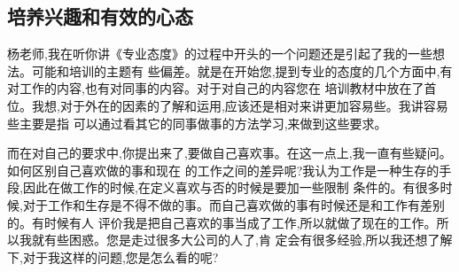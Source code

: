 \documentclass[11pt]{article}
\begin{document}
\subsection{培养兴趣和有效的心态}
\begin{staff}
  \slogo 杨老师,我在听你讲《专业态度》的过程中开头的一个问题还是引起了我的一些想法。可能和培训的主题有
  些偏差。就是在开始您,提到专业的态度的几个方面中,有对工作的内容,也有对同事的内容。对于对自己的内容您在
  培训教材中放在了首位。我想,对于外在的因素的了解和运用,应该还是相对来讲更加容易些。我讲容易些主要是指
  可以通过看其它的同事做事的方法学习,来做到这些要求。

  而在对自己的要求中,你提出来了,要做自己喜欢事。在这一点上,我一直有些疑问。如何区别自己喜欢做的事和现在
  的工作之间的差异呢?我认为工作是一种生存的手段,因此在做工作的时候,在定义喜欢与否的时候是要加一些限制
  条件的。有很多时候,对于工作和生存是不得不做的事。而自己喜欢做的事有时候还是和工作有差别的。有时候有人
  评价我是把自己喜欢的事当成了工作,所以就做了现在的工作。所以我就有些困惑。您是走过很多大公司的人了,肯
  定会有很多经验,所以我还想了解下,对于我这样的问题,您是怎么看的呢?
\end{staff}
\end{document}
